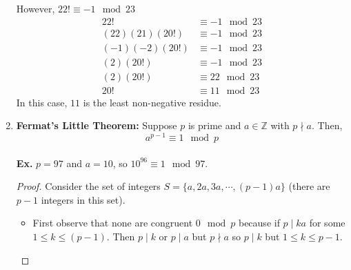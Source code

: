 \documentclass[class=article, crop=false]{standalone}
\def\integers{{\mathbb Z}}
\begin{document}
\begin{enumerate}[1.]
	However, $22!\equiv -1\mod 23$
	\begin{align*}
		22! &\equiv -1\mod 23 \\
		(22)(21)(20!) &\equiv -1\mod 23 \\
		(-1)(-2)(20!) &\equiv -1\mod 23 \\
		(2)(20!) &\equiv -1\mod 23 \\
		(2)(20!) &\equiv 22\mod 23 \\
		20! &\equiv 11\mod 23
	\end{align*}
	In this case, $11$ is the least non-negative residue.
	\item \textbf{Fermat's Little Theorem:}
	Suppose $p$ is prime and $a\in\integers$ with $p\nmid a$. Then,
	$$a^{p-1} \equiv 1\mod p$$\\
	\textbf{Ex.} $p=97$ and $a=10$, so $10^{96}\equiv 1\mod 97$.
	\begin{proof}
		Consider the set of integers $S=\{a,2a,3a,\cdots,(p-1)a\}$ (there are $p-1$ integers in this set).
		\begin{itemize}
		\item First observe that none are congruent $0\mod p$ because if $p\mid ka$ for some $1\leq k\leq (p-1)$.
		Then $p\mid k$ or $p\mid a$ but $p\nmid a$ so $p\mid k$ but $1\leq k\leq p-1$.
		

\end{itemize}
\end{proof}
\end{enumerate}
\end{document}
